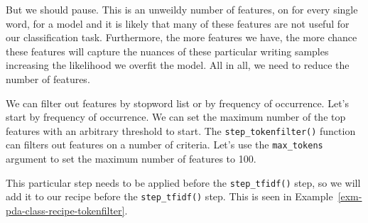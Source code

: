 \documentclass[
  letterpaper,
]{latex/krantz}
\theoremstyle{definition}
\theoremstyle{remark}
\begin{document}
But we should pause. This is an unweildy number of features, on for
every single word, for a model and it is likely that many of these
features are not useful for our classification task. Furthermore, the
more features we have, the more chance these features will capture the
nuances of these particular writing samples increasing the likelihood we
overfit the model. All in all, we need to reduce the number of features.

We can filter out features by stopword list or by frequency of
occurrence. Let's start by frequency of occurrence. We can set the
maximum number of the top features with an arbitrary threshold to start.
The \texttt{step\_tokenfilter()} function can filters out features on a
number of criteria. Let's use the \texttt{max\_tokens} argument to set
the maximum number of features to 100.

This particular step needs to be applied before the
\texttt{step\_tfidf()} step, so we will add it to our recipe before the
\texttt{step\_tfidf()} step. This is seen in
Example~\ref{exm-pda-class-recipe-tokenfilter}.
\end{document}
